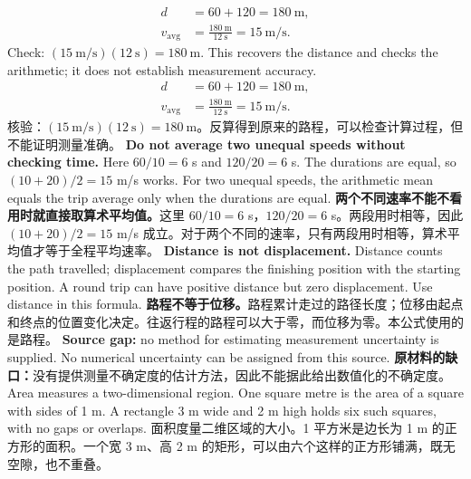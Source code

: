  {\[\begin{aligned}d&=60+120=180\ \mathrm{m},\\v_{\mathrm{avg}}&=\frac{180\ \mathrm{m}}{12\ \mathrm{s}}=15\ \mathrm{m/s}.\end{aligned}\]
 Check: $(15\ \mathrm{m/s})(12\ \mathrm{s})=180\ \mathrm{m}$. This recovers the distance and checks the arithmetic; it does not establish measurement accuracy.}
 {\[\begin{aligned}d&=60+120=180\ \mathrm{m},\\v_{\mathrm{avg}}&=\frac{180\ \mathrm{m}}{12\ \mathrm{s}}=15\ \mathrm{m/s}.\end{aligned}\]
 核验：$(15\ \mathrm{m/s})(12\ \mathrm{s})=180\ \mathrm{m}$。反算得到原来的路程，可以检查计算过程，但不能证明测量准确。}
 {\textbf{Do not average two unequal speeds without checking time.} Here $60/10=6$ s and $120/20=6$ s. The durations are equal, so $(10+20)/2=15$ m/s works. For two unequal speeds, the arithmetic mean equals the trip average only when the durations are equal.}
 {\textbf{两个不同速率不能不看用时就直接取算术平均值。}这里 $60/10=6$ s，$120/20=6$ s。两段用时相等，因此 $(10+20)/2=15$ m/s 成立。对于两个不同的速率，只有两段用时相等，算术平均值才等于全程平均速率。}
 {\textbf{Distance is not displacement.} Distance counts the path travelled; displacement compares the finishing position with the starting position. A round trip can have positive distance but zero displacement. Use distance in this formula.}
 {\textbf{路程不等于位移。}路程累计走过的路径长度；位移由起点和终点的位置变化决定。往返行程的路程可以大于零，而位移为零。本公式使用的是路程。}
 {\textbf{Source gap:} no method for estimating measurement uncertainty is supplied. No numerical uncertainty can be assigned from this source.}
 {\textbf{原材料的缺口：}没有提供测量不确定度的估计方法，因此不能据此给出数值化的不确定度。}
\clearpage
{}
 {Area measures a two-dimensional region. One square metre is the area of a square with sides of 1 m. A rectangle 3 m wide and 2 m high holds six such squares, with no gaps or overlaps.}
 {面积度量二维区域的大小。1 平方米是边长为 1 m 的正方形的面积。一个宽 3 m、高 2 m 的矩形，可以由六个这样的正方形铺满，既无空隙，也不重叠。}
